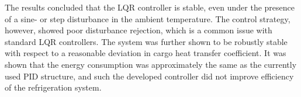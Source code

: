 

The results concluded that the LQR controller is stable, even under the presence of a sine- or step disturbance in the ambient temperature. The control strategy, however, showed poor disturbance rejection, which is a common issue with standard LQR controllers. The system was further shown to be robustly stable with respect to a reasonable deviation in cargo heat transfer coefficient. It was shown that the energy consumption was approximately the same as the currently used PID structure, and such the developed controller did not improve efficiency of the refrigeration system.\\


















